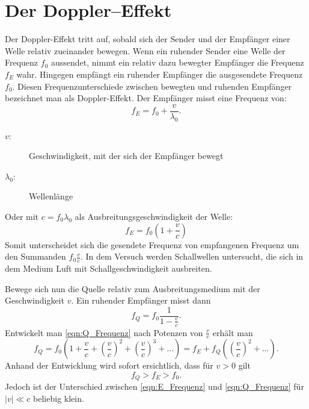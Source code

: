 \section{Der Doppler--Effekt}
Der Doppler-Effekt tritt auf, sobald sich der Sender und der Empfänger einer Welle relativ zueinander bewegen.
Wenn ein ruhender Sender eine Welle der Frequenz $f_0$ aussendet, nimmt ein relativ dazu bewegter Empfänger die Frequenz $f_E$ wahr. Hingegen empfängt ein ruhender Empfänger die ausgesendete Frequenz $f_0$. Diesen Frequenzunterschiede zwischen bewegten und ruhenden Empfänger bezeichnet man als Doppler-Effekt.
Der Empfänger misst eine Frequenz von:
 \begin{equation*}
   f_E = f_0 + \frac{v}{\lambda_0}.
 \end{equation*}
\begin{description}
    \item[$v$:] Geschwindigkeit, mit der sich der Empfänger bewegt
    \item[$\lambda_0$:] Wellenlänge
\end{description}

Oder mit $c = f_0\lambda_0$ als Ausbreitungsgeschwindigkeit der Welle:
\begin{equation}
  f_E = f_0(1 + \frac{v}{c})
  \label{eqn:E_Frequenz}
\end{equation}
Somit unterscheidet sich die gesendete Frequenz von empfangenen Frequenz um den Summanden $f_0\frac{v}{c}$.
In dem Versuch werden Schallwellen untersucht, die sich in dem Medium Luft mit Schallgeschwindigkeit ausbreiten.

Bewege sich nun die Quelle relativ zum Ausbreitungsmedium mit der Geschwindigkeit $v$. Ein ruhender Empfänger misst dann
\begin{equation}
  f_Q = f_0\frac{1}{1 - \frac{v}{c}} .
  \label{eqn:Q_Frequenz}
\end{equation}
Entwickelt man \eqref{eqn:Q_Frequenz} nach Potenzen von $\frac{v}{c}$ erhält man
\begin{equation*}
  f_Q = f_0(1 + \frac{v}{c} + (\frac{v}{c})^2 + (\frac{v}{c})^3 + ...) = f_E + f_Q((\frac{v}{c})^2 + ...) .
\end{equation*}
Anhand der Entwicklung wird sofort ersichtlich, dass für $v > 0$ gilt
\begin{equation*}
  f_Q > f_E > f_0 .
\end{equation*}
Jedoch ist der Unterschied zwischen \eqref{eqn:E_Frequenz} und \eqref{eqn:Q_Frequenz} für $\lvert v \rvert \ll c$ beliebig klein.

